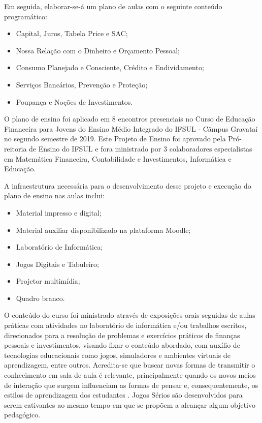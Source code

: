 Em seguida, elaborar-se-á um plano de aulas com o seguinte conteúdo programático:
\begin{itemize}
    \item Capital, Juros, Tabela Price e SAC;
    \item Nossa Relação com o Dinheiro e Orçamento Pessoal;
    \item Consumo Planejado e Consciente, Crédito e Endividamento;
    \item Serviços Bancários, Prevenção e Proteção;
    \item Poupança e Noções de Investimentos.
\end{itemize}

O plano de ensino foi aplicado em 8 encontros presenciais no Curso de Educação Financeira para Jovens do Ensino Médio Integrado do IFSUL - Câmpus Gravataí no segundo semestre de 2019. Este Projeto de Ensino foi aprovado pela Pró-reitoria de Ensino do IFSUL e fora ministrado por 3 colaboradores especialistas em Matemática Financeira, Contabilidade e Investimentos, Informática e Educação.

A infraestrutura necessária para o desenvolvimento desse projeto e execução do plano de ensino nas aulas inclui:
\begin{itemize}
    \item Material impresso e digital;
    \item Material auxiliar disponibilizado na plataforma Moodle;
    \item Laboratório de Informática;
    \item Jogos Digitais e Tabuleiro;
    \item Projetor multimídia;
    \item Quadro branco.
\end{itemize}

O conteúdo do curso foi ministrado através de exposições orais seguidas de aulas práticas com atividades no laboratório de informática e/ou trabalhos escritos, direcionados para a resolução de problemas e exercícios práticos de finanças pessoais e investimentos, visando fixar o conteúdo abordado, com auxílio de tecnologias educacionais como jogos, simuladores e ambientes virtuais de aprendizagem, entre outros. Acredita-se que buscar novas formas de transmitir o conhecimento em sala de aula é relevante, principalmente quando os novos meios de interação que surgem influenciam as formas de pensar e, consequentemente, os estilos de aprendizagem dos estudantes \cite{prensky2012}. Jogos Sérios são desenvolvidos para serem cativantes ao mesmo tempo em que se propõem a alcançar algum objetivo pedagógico.

